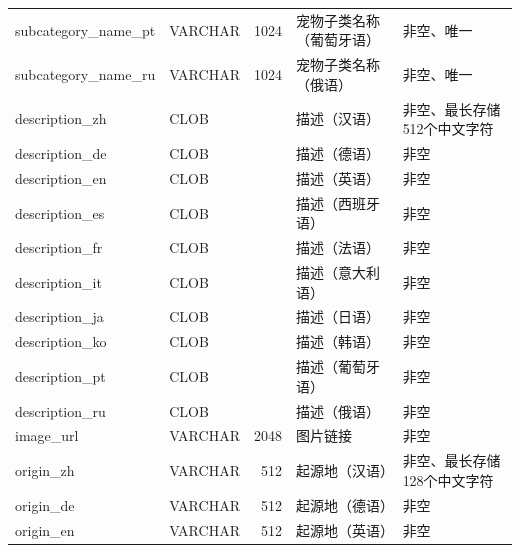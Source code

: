 \begin{longtable}[c]{@{}llrll@{}}
    subcategory\_name\_pt    & VARCHAR       & 1024        & 宠物子类名称（葡萄牙语） & 非空、唯一                                \\
    subcategory\_name\_ru    & VARCHAR       & 1024        & 宠物子类名称（俄语）   & 非空、唯一                                \\
    description\_zh          & CLOB          &             & 描述（汉语）       & 非空、最长存储512个中文字符                      \\
    description\_de          & CLOB          &             & 描述（德语）       & 非空                                   \\
    description\_en          & CLOB          &             & 描述（英语）       & 非空                                   \\
    description\_es          & CLOB          &             & 描述（西班牙语）     & 非空                                   \\
    description\_fr          & CLOB          &             & 描述（法语）       & 非空                                   \\
    description\_it          & CLOB          &             & 描述（意大利语）     & 非空                                   \\
    description\_ja          & CLOB          &             & 描述（日语）       & 非空                                   \\
    description\_ko          & CLOB          &             & 描述（韩语）       & 非空                                   \\
    description\_pt          & CLOB          &             & 描述（葡萄牙语）     & 非空                                   \\
    description\_ru          & CLOB          &             & 描述（俄语）       & 非空                                   \\
    image\_url               & VARCHAR       & 2048        & 图片链接         & 非空                                   \\
    origin\_zh               & VARCHAR       & 512         & 起源地（汉语）      & 非空、最长存储128个中文字符                      \\
    origin\_de               & VARCHAR       & 512         & 起源地（德语）      & 非空                                   \\
    origin\_en               & VARCHAR       & 512         & 起源地（英语）      & 非空                                   \\

\end{longtable}
